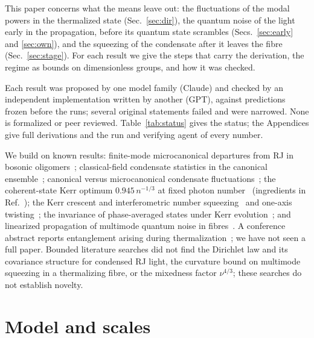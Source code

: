 \documentclass[aps,pra,twocolumn,superscriptaddress,nofootinbib,floatfix]{revtex4-2}
\begin{document}
This paper concerns what the means leave out: the fluctuations of the modal powers in the thermalized state
(Sec.~\ref{sec:dir}), the quantum noise of the light early in the propagation, before its quantum state scrambles
(Secs.~\ref{sec:early} and \ref{sec:own}), and the squeezing of the condensate after it leaves the fibre
(Sec.~\ref{sec:stage}). For each result we give the steps that carry the derivation, the regime as bounds on
dimensionless groups, and how it was checked.

Each result was proposed by one model family (Claude) and checked by an independent implementation written by another
(GPT), against predictions frozen before the runs; several original statements failed and were narrowed. None is
formalized or peer reviewed. Table~\ref{tab:status} gives the status; the Appendices give full derivations and the
run and verifying agent of every number.

We build on known results: finite-mode microcanonical departures from RJ in bosonic oligomers~\cite{vardi2024};
classical-field condensate statistics in the canonical ensemble~\cite{witkowska2009}; canonical versus microcanonical
condensate fluctuations~\cite{holthaus1998}; the coherent-state Kerr optimum
$0.945\,n^{-1/3}$ at fixed photon number~\cite{najafabadi2023} (ingredients in Ref.~\cite{bajer2002}); the Kerr crescent and interferometric number squeezing~\cite{kitagawa1986}
and one-axis twisting~\cite{kitagawa1993}; the invariance of phase-averaged states under Kerr
evolution~\cite{vintskevich2019}; and linearized propagation of multimode quantum noise in fibres~\cite{sloan2025}.
A conference abstract reports entanglement arising during thermalization~\cite{birk2023}; we have not seen a full
paper. Bounded literature searches did not find the Dirichlet law and its covariance structure for condensed RJ light,
the curvature bound on multimode squeezing in a thermalizing fibre, or the mixedness factor $\nu^{4/3}$; these searches
do not establish novelty.

\section{Model and scales}\label{sec:model}
\end{document}
